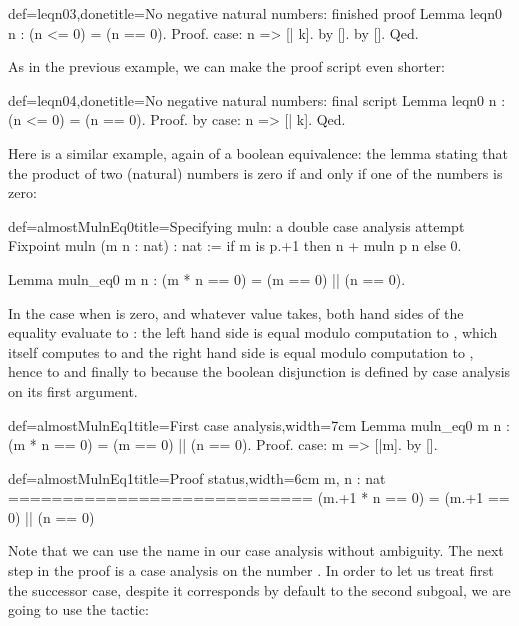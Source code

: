 \begin{coq}{def=leqn03,done}{title=No negative natural numbers: finished proof}
Lemma leqn0 n : (n <= 0) = (n == 0).
Proof.
case: n => [| k].
  by [].
by [].
Qed.
\end{coq}
As in the previous example, we can make the proof script even shorter:

\begin{coq}{def=leqn04,done}{title=No negative natural numbers: final script}
Lemma leqn0 n : (n <= 0) = (n == 0).
Proof.  by case: n => [| k].  Qed.
\end{coq}

Here is a similar example, again of a boolean equivalence: the lemma
stating that the product of two (natural) numbers is zero if and only
if one of the numbers is zero:

\begin{coq}{def=almostMulnEq0}{title=Specifying muln: a double case analysis attempt}
Fixpoint muln (m n : nat) : nat :=
  if m is p.+1 then n + muln p n else 0.

Lemma muln_eq0 m n : (m * n == 0) = (m == 0) || (n == 0).
\end{coq}
In the case when  is zero, and whatever value  takes, both
hand sides of the equality evaluate to : the left hand side is
equal modulo computation to , which itself computes to
 and the right hand side is equal modulo computation to
, hence to  and finally to
 because the boolean disjunction \C{(_ || _)} is defined by
case analysis on its first argument.

\begin{coq}{def=almostMulnEq1}{title=First case analysis,width=7cm}
Lemma muln_eq0 m n :
  (m * n == 0) = (m == 0) || (n == 0).
Proof.
case: m => [|m].
  by [].
\end{coq}
\begin{coqout}{def=almostMulnEq1}{title=Proof status,width=6cm}
m, n : nat
============================
(m.+1 * n == 0) =
  (m.+1 == 0) || (n == 0)
\end{coqout}
Note that we can use the name  in our case analysis without
ambiguity. The next step in the proof is a case analysis on the number
. 
In order to let us treat first the successor case,
despite it corresponds by default to the second subgoal, we are going
to use the  tactic:

